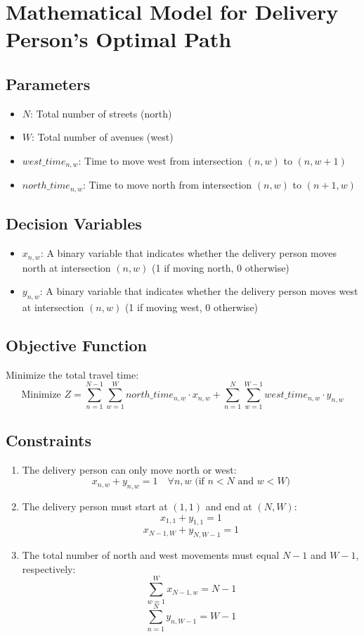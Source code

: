 \documentclass{article}
\begin{document}
\section*{Mathematical Model for Delivery Person's Optimal Path}

\subsection*{Parameters}
\begin{itemize}
    \item $N$: Total number of streets (north)
    \item $W$: Total number of avenues (west)
    \item $west\_time_{n,w}$: Time to move west from intersection $(n,w)$ to $(n,w+1)$
    \item $north\_time_{n,w}$: Time to move north from intersection $(n,w)$ to $(n+1,w)$
\end{itemize}

\subsection*{Decision Variables}
\begin{itemize}
    \item $x_{n,w}$: A binary variable that indicates whether the delivery person moves north at intersection $(n,w)$ (1 if moving north, 0 otherwise)
    \item $y_{n,w}$: A binary variable that indicates whether the delivery person moves west at intersection $(n,w)$ (1 if moving west, 0 otherwise)
\end{itemize}

\subsection*{Objective Function}
Minimize the total travel time:
\[
\text{Minimize } Z = \sum_{n=1}^{N-1} \sum_{w=1}^{W} north\_time_{n,w} \cdot x_{n,w} + \sum_{n=1}^{N} \sum_{w=1}^{W-1} west\_time_{n,w} \cdot y_{n,w}
\]

\subsection*{Constraints}
\begin{enumerate}
    \item The delivery person can only move north or west:
    \[
    x_{n,w} + y_{n,w} = 1 \quad \forall n, w \text{ (if } n < N \text{ and } w < W\text{)}
    \]

    \item The delivery person must start at $(1,1)$ and end at $(N,W)$:
    \[
    x_{1,1} + y_{1,1} = 1
    \]
    \[
    x_{N-1,W} + y_{N,W-1} = 1
    \]

    \item The total number of north and west movements must equal $N-1$ and $W-1$, respectively:
    \[
    \sum_{w=1}^{W} x_{N-1,w} = N-1
    \]
    \[
    \sum_{n=1}^{N} y_{n,W-1} = W-1
    \]
\end{enumerate}
\end{document}
